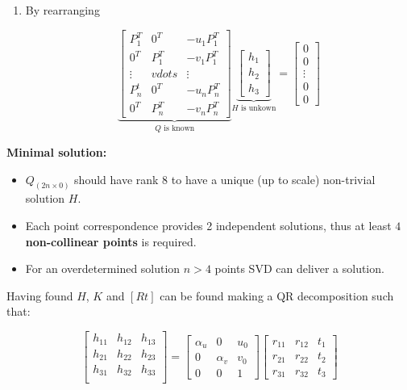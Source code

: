 \documentclass[10pt,a4paper]{scrartcl}
\begin{document}
\begin{multicols*}{2}
\begin{enumerate}
\item By rearranging

\begin{equation*}
\underbrace{\begin{bmatrix}
P_1^T&0^T&-u_1 P_1^T\\
0^T&P_1^T&-v_1P_1^T\\
\vdots&vdots&\vdots\\
P_n^t&0^T&-u_nP_n^T\\
0^T&P_n^T&-v_nP_n^T
\end{bmatrix}}_{Q \text{ is known}}\underbrace{\begin{bmatrix}
h_1\\h_2\\h_3
\end{bmatrix}}_{H \text{ is unkown}}=\begin{bmatrix}
0\\0\\\vdots\\0\\0
\end{bmatrix}
\end{equation*}

\end{enumerate}

\textbf{Minimal solution:}

\begin{itemize}
\item $Q_{(2n\times 0)}$ should have rank $8$ to have a unique (up to scale) non-trivial solution $H$.
\item Each point correspondence provides 2 independent solutions, thus at least $4$ \textbf{non-collinear points} is required.
\item For an overdetermined solution $n>4$ points SVD can deliver a solution.
\end{itemize}

Having found $H$, $K$ and $[R t]$ can be found making a QR decomposition such that:

\begin{equation*}
\begin{bmatrix}
h_{11}&h_{12}&h_{13}\\
h_{21}&h_{22}&h_{23}\\
h_{31}&h_{32}&h_{33}\\
\end{bmatrix}=\begin{bmatrix}\alpha_u&0&u_0\\0&\alpha_v&v_0\\0&0&1\end{bmatrix}\begin{bmatrix}
r_{11}&r_{12}&t_1\\r_{21}&r_{22}&t_2\\r_{31}&r_{32}&t_3
\end{bmatrix}
\end{equation*}


\end{multicols*}
\end{document}
